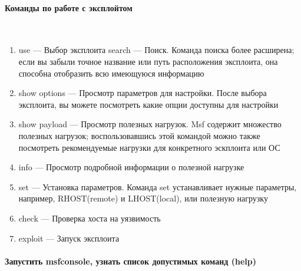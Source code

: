 \documentclass[10pt,a4paper]{article}
\begin{document}
\paragraph{Команды по работе с эксплойтом}
~

\begin{enumerate}
\item use — Выбор эксплоита
search — Поиск. Команда поиска более расширена; если вы забыли точное название или путь расположения эксплоита, она способна отобразить всю имеющуюся информацию
\item show options — Просмотр параметров для настройки. После выбора эксплоита, вы можете посмотреть какие опции доступны для настройки
\item show payload — Просмотр полезных нагрузок. Msf содержит множество полезных нагрузок; воспользовавшись этой командой можно также посмотреть рекомендуемые нагрузки для конкретного эскплоита или ОС
\item info — Просмотр подробной информации о полезной нагрузке
\item set — Установка параметров. Команда set устанавливает нужные параметры, например, RHOST(remote) и LHOST(local), или полезную нагрузку 
\item check — Проверка хоста на уязвимость
\item exploit — Запуск эксплоита
\end{enumerate}

\paragraph{Запустить msfconsole, узнать список допустимых команд (help)}
~
\end{document}

